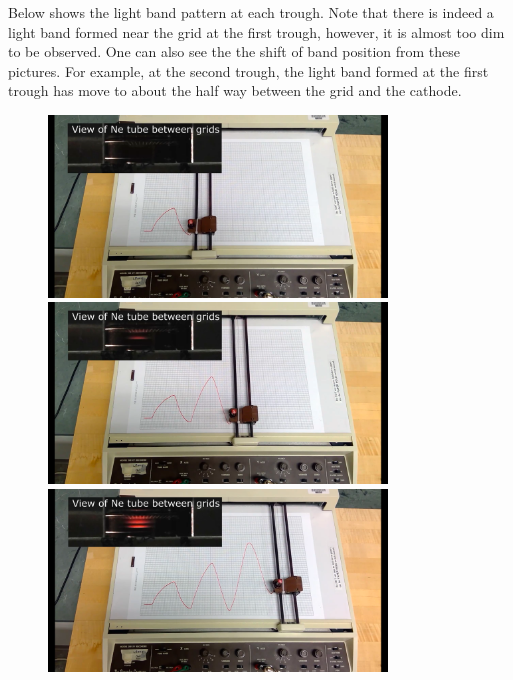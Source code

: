 \documentclass[12pt]{article}
\begin{document}
Below shows the light band pattern at each trough. Note that there is indeed a light band formed near the grid at the first trough, however, it is almost too dim to be observed. One can also see the the shift of band position from these pictures. For example, at the second trough, the light band formed at the first trough has move to about the half way between the grid and the cathode.
\smallskip
\begin{figure}[h]
\includegraphics[width=9cm]{1st.png}
\smallskip
\includegraphics[width=9cm]{2nd.png}
\includegraphics[width=9cm]{3rd.png}


\end{figure}
\end{document}
